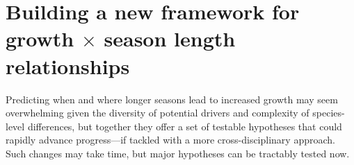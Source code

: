 \documentclass[11pt]{article}
\begin{document}

\section*{Building a new framework for growth $\times$ season length relationships} 
Predicting when and where longer seasons lead to increased growth may seem overwhelming given the diversity of potential drivers and complexity of species-level differences, but together they offer a set of testable hypotheses that could rapidly advance progress---if tackled with a more cross-disciplinary approach. Such changes may take time, but major hypotheses can be tractably tested now. 
\end{document}
